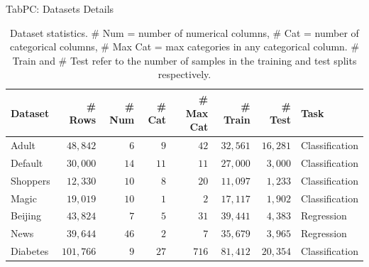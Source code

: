 \begin{frame}[fragile]{TabPC: Datasets Details}
  
\begin{table}[ht]
    \centering
    \caption{Dataset statistics. \# Num = number of numerical columns, \# Cat = number of categorical columns, \# Max Cat = max categories in any categorical column. \# Train and \# Test refer to the number of samples in the training and test splits respectively.}
    \label{tbl:exp-dataset}
    \small
    \begin{tabular}{lrrrrrrl}
        \toprule
        \textbf{Dataset} & \textbf{\# Rows} & \textbf{\# Num} & \textbf{\# Cat} & \textbf{\# Max Cat} & \textbf{\# Train} & \textbf{\# Test} & \textbf{Task} \\
        \midrule
        Adult     & $48,842$  & $6$  & $9$  & $42$  & $32,561$ & $16,281$ & Classification \\
        Default   & $30,000$  & $14$ & $11$ & $11$  & $27,000$ & $3,000$  & Classification \\
        Shoppers  & $12,330$  & $10$ & $8$  & $20$  & $11,097$ & $1,233$  & Classification \\
        Magic     & $19,019$  & $10$ & $1$  & $2$   & $17,117$ & $1,902$  & Classification \\
        Beijing   & $43,824$  & $7$  & $5$  & $31$  & $39,441$ & $4,383$  & Regression     \\
        News      & $39,644$  & $46$ & $2$  & $7$   & $35,679$ & $3,965$  & Regression     \\
        Diabetes  & $101,766$ & $9$  & $27$ & $716$ & $81,412$ & $20,354$ & Classification \\
        \bottomrule
    \end{tabular}
\end{table}

\end{frame}
